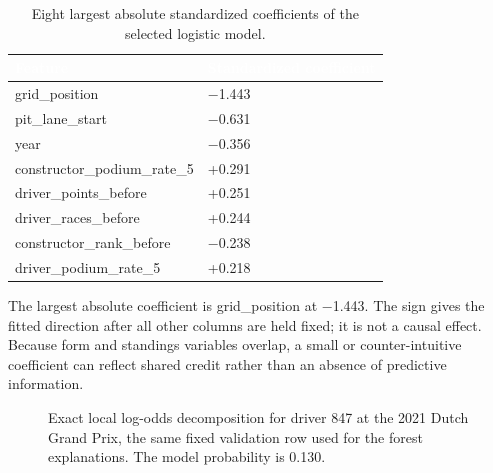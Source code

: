 \documentclass[10pt,a4paper]{article}
\begin{document}
\begin{table}[H]
\centering
\caption{Eight largest absolute standardized coefficients of the selected logistic model.}
{\small{}
\begin{tabular}{>{\raggedright\arraybackslash}p{}>{\raggedleft\arraybackslash}p{}}
\toprule
\rowcolor{navy}
\textcolor{white}{\textbf{Feature}} & \textcolor{white}{\textbf{Standardized coefficient}} \\
\midrule
grid\_position & $-$1.443 \\
pit\_lane\_start & $-$0.631 \\
year & $-$0.356 \\
constructor\_podium\_rate\_5 & +0.291 \\
driver\_points\_before & +0.251 \\
driver\_races\_before & +0.244 \\
constructor\_rank\_before & $-$0.238 \\
driver\_podium\_rate\_5 & +0.218 \\
\bottomrule
\end{tabular}}
\end{table}


The largest absolute coefficient is grid\_position at $-$1.443. The sign gives the fitted direction after all other columns are held fixed; it is not a causal effect. Because form and standings variables overlap, a small or counter-intuitive coefficient can reflect shared credit rather than an absence of predictive information.


\begin{figure}[H]
\centering
{}
\caption{Exact local log-odds decomposition for driver 847 at the 2021 Dutch Grand Prix, the same fixed validation row used for the forest explanations. The model probability is 0.130.}
\end{figure}
\end{document}

